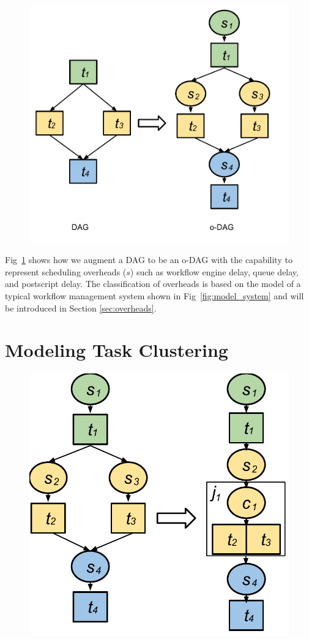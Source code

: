 \begin{figure}[h!]
\includegraphics[width=0.6\linewidth]{figures/model/odag.pdf}
\centering
  \label{fig:model_odag}
\end{figure}

Fig~\ref{fig:model_odag} shows how we augment a DAG to be an o-DAG with the capability to represent scheduling overheads ($s$) such as workflow engine delay, queue delay, and postscript delay. The classification of overheads is based on the model of a typical workflow management system shown in Fig~\ref{fig:model_system} and will be introduced in Section \ref{sec:overheads}. 


\section{Modeling Task Clustering}
\label{sec:task_clustering}

\begin{figure}[h!]
\centering
 \includegraphics[width=0.5\linewidth]{figures/introduction/hc.pdf}
  \label{fig:intro_hc}
\end{figure}


